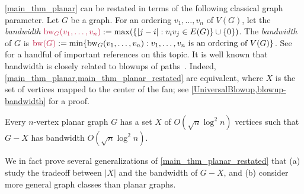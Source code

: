\documentclass{patmorin}
\makeatletter
\renewcommand{\le}{\leqslant}
\renewcommand{\leq}{\leqslant}
\newcommand{\defin}[1]{\emph{\textcolor{brightmaroon}{#1}}}
\def\mathcolor#1#{\@mathcolor{#1}}
\def\@mathcolor#1#2#3{%
  \protect\leavevmode
  \begingroup
    \color#1{#2}#3%
  \endgroup
}
\newcommand{\mathdefin}[1]{\mathcolor{brightmaroon}{#1}}
\DeclareMathOperator{\bw}{bw}
\makeatother
\begin{document}
\cref{main_thm_planar} can be restated in terms of the following classical graph parameter. 
Let $G$ be a graph. For an ordering  $v_1,\ldots,v_n$ of $V(G)$, let the \defin{bandwidth} $\mathdefin{\bw_G(v_1,\ldots,v_n)}:=\max(\{|j-i|: v_iv_j\in E(G)\}\cup\{0\})$. 
The \defin{bandwidth} of $G$ is $\mathdefin{\bw(G)}:=\min\{\bw_G(v_1,\ldots,v_n):\text{$v_1,\ldots,v_n$ is an ordering of $V(G)$}\}$.
 See \citep{CS89,ST20,ABET20,BPTW10,rao:small,BST09,feige:approximating} for a handful of important references on this topic. 
%
It is well known that bandwidth is closely related to blowups of paths~\citep{DSW07,BPTW10}. Indeed, \cref{main_thm_planar,main_thm_planar_restated} are equivalent, where $X$ is the set of vertices mapped to the center of the fan; see \cref{UniversalBlowup,blowup-bandwidth} for a proof. 


\begin{thm}\label{main_thm_planar_restated}
  Every $n$-vertex planar graph $G$ has a set $X$ of $O(\sqrt{n}\log^2n)$ vertices such that $G-X$ has bandwidth $O(\sqrt{n}\log^2 n)$.
\end{thm}

We in fact prove several generalizations of \cref{main_thm_planar_restated} that (a) study the tradeoff between $|X|$ and the bandwidth of $G-X$, and (b) consider more general graph classes than planar graphs.
\end{document}
